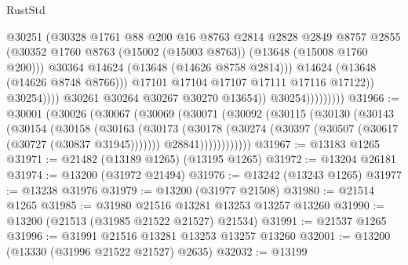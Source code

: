 \begin{lexlean}{RustStd}
\begin{coremodule}
                                        @30251
                                        (@30328
                                          @1761
                                          @88
                                          @200
                                          @16
                                          @8763
                                          @2814
                                          @2828
                                          @2849
                                          @8757
                                          @2855
                                          (@30352
                                            @1760
                                            @8763
                                            (@15002 (@15003 @8763))
                                            (@13648 (@15008 @1760 @200)))
                                          @30364
                                          @14624
                                          (@13648 (@14626 @8758 @2814)))
                                        @14624
                                        (@13648 (@14626 @8748 @8766)))
                                      @17101
                                      @17104
                                      @17107
                                      @17111
                                      @17116
                                      @17122))
                                  @30254))))
                          @30261
                          @30264
                          @30267
                          @30270
                          @13654))
                      @30254)))))))))
@31966 := @30001
    (@30026
      (@30067
        (@30069
          (@30071
            (@30092
              (@30115
                (@30130
                  (@30143
                    (@30154
                      (@30158
                        (@30163
                          (@30173
                            (@30178 (@30274 (@30397 (@30507 (@30617 (@30727 (@30837 @31945)))))))
                            @28841))))))))))))
@31967 := @13183 @1265
@31971 := @21482 (@13189 @1265) (@13195 @1265)
@31972 := @13204 @26181
@31974 := @13200 (@31972 @21494)
@31976 := @13242 (@13243 @1265)
@31977 := @13238 @31976
@31979 := @13200 (@31977 @21508)
@31980 := @21514 @1265
@31985 := @31980 @21516 @13281 @13253 @13257 @13260
@31990 := @13200 (@21513 (@31985 @21522 @21527) @21534)
@31991 := @21537 @1265
@31996 := @31991 @21516 @13281 @13253 @13257 @13260
@32001 := @13200 (@13330 (@31996 @21522 @21527) @2635)
@32032 := @13199

\end{coremodule}
\end{lexlean}
